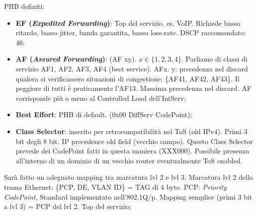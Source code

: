 PHB definiti:

\begin{itemize}

\item{\textbf{EF (\textit{Expedited Forwarding})}}: Top del servizio. es. VoIP. Richiede basso ritardo, basso jitter, banda garantita, basso loss-rate. DSCP raccomandato: 46;
\item{\textbf{AF (\textit{Assured Forwarding})}}: (AF xy). $x \in\{1,2,3,4\}$. Parliamo di classi di servizio AF1, AF2, AF3, AF4 (best service). AFx. y: precedenza nel discard qualora si verificassero situazioni di congestione: \{AF41, AF42, AF43\}. Il peggiore di tutti è praticamente l'AF13. Massima precedenza nel discard. AF corrisponde più o meno al Controlled Load dell'IntServ;
\item{\textbf{Best Effort}}: PHB di default. (0x00 DiffServ CodePoint);
\item{\textbf{Class Selector}}: inserito per retrocompatibilità nel ToS (old IPv4). Primi 3 bit degli 8 bit. IP precedence old field (vecchio campo). Questo Class Selector prevede dei CodePoint fatti in questa maniera (XXX000). Possibile presenza all'interno di un dominio di un vecchio router eventualmente ToS enabled.
\end{itemize}

Sarà fatto un adeguato mapping tra marcatura lvl 2 e lvl 3. Marcatura lvl 2 della trama Ethernet: \{PCP, DE, VLAN ID\} = TAG di 4 byte. PCP: \textit{Priority CodePoint}, Standard implementato nell'802.1Q/p. Mapping semplice (primi 3 bit a lvl 3) = PCP del lvl 2. Top del servizio;
